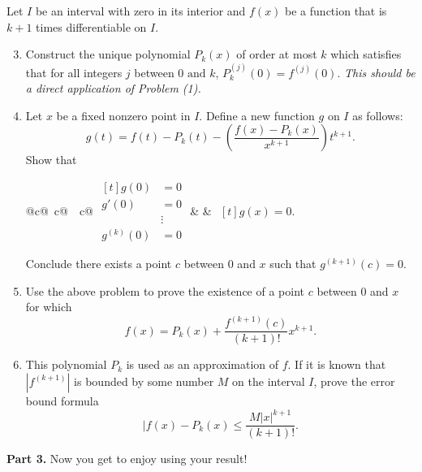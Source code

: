 \documentclass[12pt]{article}
\begin{document}
Let \(I\) be an interval with zero in its interior and \(f(x)\) be a function that is \(k + 1\) times differentiable on \(I\).

\begin{enumerate}
    \setcounter{enumi}{2}
    \item Construct the unique polynomial \(P_{k}(x)\) of order at most \(k\) which satisfies that for all integers \(j\) between \(0 \text{ and } k\), \(P_{k}^{(j)}(0) = f^{(j)}(0)\). \textit{This should be a direct application of Problem (1).}
    \item Let \(x\) be a fixed nonzero point in \(I\). Define a new function \(g\) on \(I\) as follows:
    \[
        g(t) = f(t) - P_{k}(t) - \left(\frac{f(x) - P_{k}(x)}{x^{k + 1}}\right)t^{k + 1}.
    \]
    Show that 

    \begin{table}[htbp]
        \centering
        \begin{tabular}{@{}c@{\qquad\quad~}c@{\qquad\quad~~}c@{}}
            \(\begin{aligned}[t]
                g(0) &= 0 \\
                g'(0) &= 0 \\
                &\vdots \\
                g^{(k)}(0) &= 0
            \end{aligned}\)
            &  &
            \(\begin{aligned}[t]
                g(x) = 0.
            \end{aligned}\)
        \end{tabular}
    \end{table}

    Conclude there exists a point \(c\) between 0 and \(x\) such that \(g^{(k + 1)}(c) = 0\).
    \item Use the above problem to prove the existence of a point \(c\) between 0 and \(x\) for which 
    \[
        f(x) = P_{k}(x) + \frac{f^{(k + 1)}(c)}{(k + 1)!}x^{k + 1}.
    \]
    \item This polynomial \(P_{k}\) is used as an approximation of \(f\). If it is known that \(|f^{(k + 1)}|\) is bounded by some number \(M\) on the interval \(I\), prove the error bound formula 
    \[
        |f(x) - P_{k}(x) \leq \frac{M |x|^{k + 1}}{(k + 1)!}.
    \]
\end{enumerate}

\noindent\textbf{Part 3.} Now you get to enjoy using your result!
\end{document}
